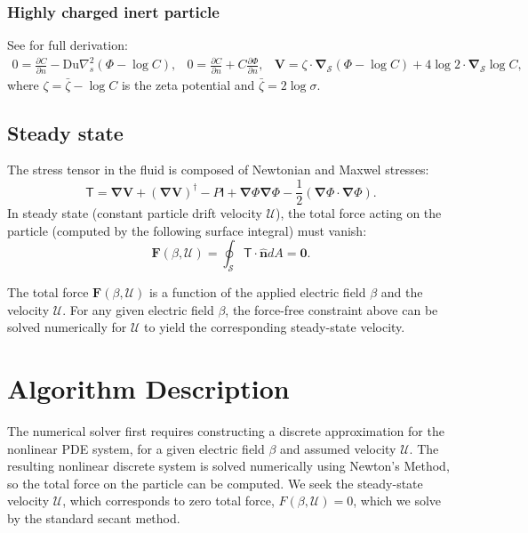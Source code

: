 \documentclass[10pt]{ijnam}
\newcommand{\deriv}[2]{\frac{\partial #1}{\partial #2}}
\newcommand{\pars}[1]{\left(#1\right)}
\newcommand\bnabla{\boldsymbol{\nabla}}
\newcommand\bV{\boldsymbol{V}}
\newcommand\bF{\boldsymbol{F}}
\newcommand\bnhat{\hat{\boldsymbol{n}}}
\newcommand\bzero{\boldsymbol{0}}
\newcommand\cU{\mathscr{U}}
\newcommand\tI{\mathsf{I}}
\newcommand\tT{\mathsf{T}}
\begin{document}
\subsubsection{Highly charged inert particle}
See \cite{schnitzer2012surface} for full derivation:
\begin{equation} \label{eq:ephor_bnd}
\begin{array}{ccc}
0 = {\deriv{C}{n} - \text{Du} \nabla^2_s \pars{\varPhi - \log C}}, & 
0 = {\deriv{C}{n} + C \deriv{\varPhi}{n}}, &
\bV = \zeta \cdot \bnabla_\mathcal{S} \pars{\varPhi - \log C} +
4 \log 2 \cdot \bnabla_\mathcal{S} \log C,
\end{array}\end{equation}
where $\zeta = \bar{\zeta} - \log C$ 
is the zeta potential and $\bar{\zeta} = 2 \log \sigma$.

\subsection{Steady state}
The stress tensor in the fluid is composed of Newtonian and Maxwel stresses:
\begin{equation}
\label{eq:tensor}
\tT = \bnabla \bV + (\bnabla \bV)^\dagger - P \tI
+ \bnabla \varPhi \bnabla \varPhi - \frac{1}{2} (\bnabla \varPhi \cdot \bnabla \varPhi). 
\end{equation} 
In steady state (constant particle drift velocity $\cU$), the total force acting on the particle 
(computed by the following surface integral) must vanish:
\begin{equation} \label{eq:zero_force}
 \bF(\beta, \cU) = \oint_\mathcal{S} \tT \cdot \bnhat dA = \bzero.
\end{equation}

The total force $\bF(\beta, \cU)$ is a function of the applied electric field $\beta$ and
the velocity $\cU$.
For any given electric field $\beta$, the force-free constraint above 
can be solved numerically for $\cU$ to yield the corresponding steady-state velocity.

\section{Algorithm Description} \label{sec:algorithm}
The numerical solver first requires constructing a discrete 
approximation for the nonlinear PDE system,
for a given electric field $\beta$ and assumed velocity $\cU$. 
The resulting nonlinear discrete system is
solved numerically using Newton's Method, so the total force on the
particle can be computed. 
We seek the steady-state velocity $\cU$, 
which corresponds to zero total force, $F(\beta, \cU) = 0$,
which we solve by the standard secant method.
\end{document}
